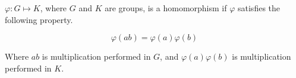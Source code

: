 \documentclass{report}
\begin{document}
$\varphi : G \mapsto K$, where $G$ and $K$ are groups, is a homomorphism if $\varphi$ satisfies the following property.

\[\varphi(ab) = \varphi(a)\varphi(b) \]

Where $ab$ is multiplication performed in $G$, and $\varphi(a)\varphi(b)$ is multiplication performed in $K$.
\end{document}
